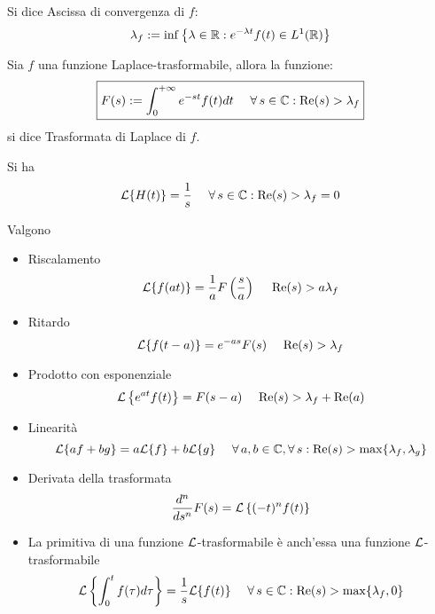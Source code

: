 \begin{defn}
Si dice Ascissa di convergenza di $\displaystyle f$:
\begin{equation*}
\lambda _{f} :=\inf\left\{\lambda \in \mathbb{R}  :e^{-\lambda t} f( t) \in L^{1}(\mathbb{R} )\right\}
\end{equation*}
\end{defn}
\begin{defn}
Sia $\displaystyle f$ una funzione Laplace-trasformabile, allora la funzione:
\begin{equation*}
\boxed{F( s) :=\int ^{+\infty }_{0} e^{-st} f( t) dt\ \ \ \ \forall s\in \CC  :\mathrm{Re}( s)  >\lambda _{f}}
\end{equation*}
si dice Trasformata di Laplace di $\displaystyle f$.
\end{defn}
\begin{rem}
 Si ha
\begin{equation*}
\Lc\{H( t)\} =\frac{1}{s} \ \ \ \ \forall s\in \CC  :\mathrm{Re}( s)  >\lambda _{f} =0
\end{equation*}
\end{rem}
\begin{thm}
[Proprietà] Valgono
\begin{itemize}
\item Riscalamento\begin{equation*}
\mathcal{L}\{f( at)\} =\frac{1}{a} F\left(\frac{s}{a}\right) \ \ \ \ \mathrm{Re}( s)  >a\lambda _{f}
\end{equation*}
\item Ritardo\begin{equation*}
\mathcal{L}\{f( t-a)\} =e^{-as} F( s) \ \ \ \ \mathrm{Re}( s)  >\lambda _{f}
\end{equation*}
\item Prodotto con esponenziale\begin{equation*}
\Lc\left\{e^{at} f( t)\right\} =F( s-a) \ \ \ \ \mathrm{Re}( s)  >\lambda _{f} +\mathrm{Re}( a)
\end{equation*}
\item Linearità\begin{equation*}
\Lc\{af+bg\} =a\Lc\{f\} +b\Lc\{g\} \ \ \ \ \forall a,b\in \CC  ,\forall s:\mathrm{Re}( s)  >\max\{\lambda _{f} ,\lambda _{g}\}
\end{equation*}
\item Derivata della trasformata\begin{equation*}
\frac{d^{n}}{ds^{n}} F( s) =\mathcal{L}\left\{( -t)^{n} f( t)\right\}
\end{equation*}
\item La primitiva di una funzione $\mathcal{L}$-trasformabile è anch'essa una funzione $\mathcal{L}$-trasformabile\begin{equation*}
\Lc\left\{\int ^{t}_{0} f( \tau ) d\tau \right\} =\frac{1}{s}\Lc\{f( t)\} \ \ \ \ \forall s\in \CC  :\mathrm{Re}( s)  >\max\{\lambda _{f} ,0\}
\end{equation*}
\end{itemize}
\end{thm}
